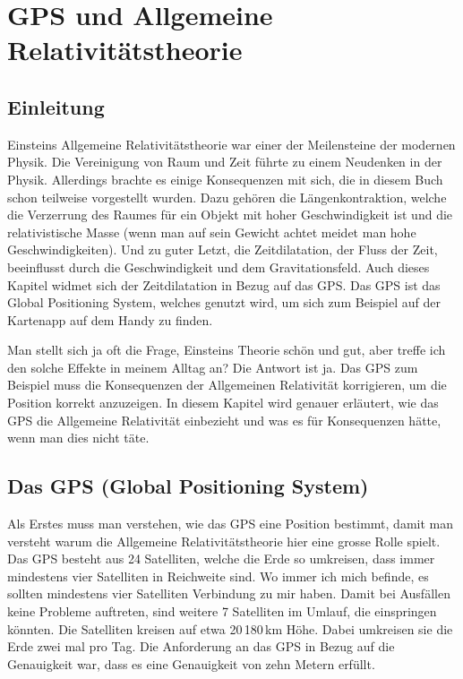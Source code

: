 
\chapter{GPS und Allgemeine Relativitätstheorie\label{chapter:thema}}
\begin{refsection}

\section{Einleitung}
Einsteins Allgemeine Relativitätstheorie war einer der Meilensteine der modernen Physik. Die Vereinigung von Raum und Zeit führte zu einem Neudenken in der Physik. Allerdings brachte es einige Konsequenzen mit sich, die in diesem Buch schon teilweise vorgestellt wurden. Dazu gehören die Längenkontraktion, welche die Verzerrung des Raumes für ein Objekt mit hoher Geschwindigkeit ist und die relativistische Masse (wenn man auf sein Gewicht achtet meidet man hohe Geschwindigkeiten). Und zu guter Letzt, die Zeitdilatation, der Fluss der Zeit, beeinflusst durch die Geschwindigkeit und dem Gravitationsfeld. Auch dieses Kapitel widmet sich der Zeitdilatation in Bezug auf das GPS. Das GPS ist das Global Positioning System, welches genutzt wird, um sich zum Beispiel auf der Kartenapp auf dem Handy zu finden.
%
%

Man stellt sich ja oft die Frage, Einsteins Theorie schön und gut, aber treffe ich den solche Effekte in meinem Alltag an? Die Antwort ist ja. Das GPS zum Beispiel muss die Konsequenzen der Allgemeinen Relativität korrigieren, um die Position korrekt anzuzeigen. In diesem Kapitel wird genauer erläutert, wie das GPS die Allgemeine Relativität einbezieht und was es für Konsequenzen hätte, wenn man dies nicht täte.

\section{Das GPS (Global Positioning System)}
Als Erstes muss man verstehen, wie das GPS eine Position bestimmt, damit man versteht warum die Allgemeine Relativitätstheorie hier eine grosse Rolle spielt. Das GPS besteht aus 24 Satelliten, welche die Erde so umkreisen, dass immer mindestens vier Satelliten in Reichweite sind. Wo immer ich mich befinde, es sollten mindestens vier Satelliten Verbindung zu mir haben. Damit bei Ausfällen keine Probleme auftreten, sind weitere 7 Satelliten im Umlauf, die einspringen könnten. Die Satelliten kreisen auf etwa 20\,180\,km Höhe. Dabei umkreisen sie die Erde zwei mal pro Tag. Die Anforderung an das GPS in Bezug auf die Genauigkeit war, dass es eine Genauigkeit von zehn Metern erfüllt. 


\end{refsection}
